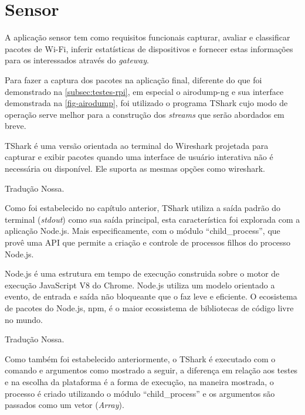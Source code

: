 \section{Sensor}
\label{sec:app-sensor}

A aplicação sensor tem como requisitos funcionais capturar, avaliar e classificar pacotes de
Wi-Fi, inferir estatísticas de dispositivos e fornecer estas informações para
os interessados através do \emph{gateway}.

Para fazer a captura dos pacotes na aplicação final, diferente do que foi
demonstrado na \autoref{subsec:testes-rpi}, em especial o airodump-ng e
sua interface demonstrada na \autoref{fig-airodump}, foi utilizado o programa
TShark cujo modo de operação serve melhor para a construção dos
\emph{streams} que serão abordados em breve.

\begin{citacao}

	TShark é uma versão orientada ao terminal do Wireshark projetada para capturar
	e exibir pacotes quando uma interface de usuário interativa não é necessária ou
	disponível. Ele suporta as mesmas opções como wireshark. \

	 Tradução Nossa.
\end{citacao}

Como foi estabelecido no capítulo anterior, TShark utiliza a saída padrão do
terminal (\emph{stdout}) como sua saída principal, esta característica foi
explorada com a aplicação Node.js. Mais especificamente, com o módulo
``child\_process'', que provê uma API que permite a criação e controle de
processos filhos do processo Node.js.

\begin{citacao}

	Node.js é uma estrutura em tempo de execução construida sobre o motor de
	execução JavaScript V8 do Chrome. Node.js utiliza um modelo orientado a
	evento, de entrada e saída não bloqueante que o faz leve e eficiente.
	O ecosistema de pacotes do Node.js, npm, é o maior ecossistema de bibliotecas
	de código livre no mundo. \

	 Tradução Nossa.
\end{citacao}

Como também foi estabelecido anteriormente, o TShark é executado com o
comando e argumentos como mostrado a seguir, a diferença em relação aos testes e
na escolha da plataforma é a forma de execução, na maneira mostrada, o processo é
criado utilizando o módulo ``child\_process'' \cite{child_process} e os
argumentos são passados como um vetor (\emph{Array}).

